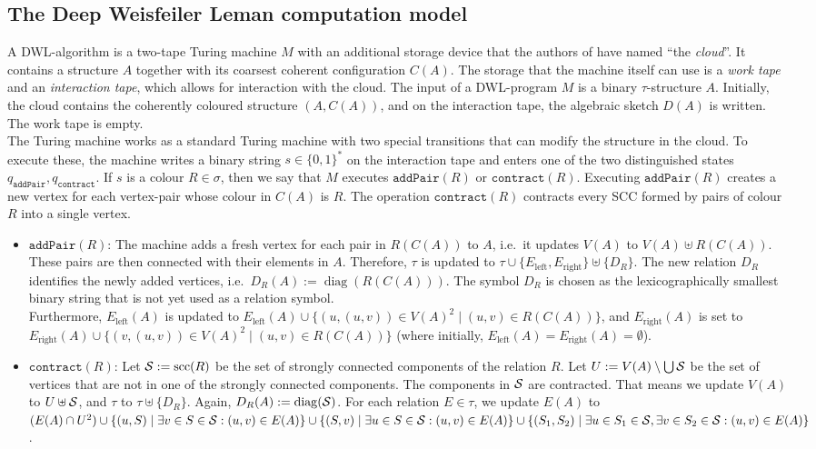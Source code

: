 \documentclass[a4paper,UKenglish,cleveref, autoref, thm-restate]{lipics-v2021}
\newcommand{\Ss}{{\cal S}}
\newcommand{\pairOp }{\texttt{addPair}}
\newcommand{\sccOp }{\texttt{contract}}
\newcommand{\scc}{{\operatorname{scc}}}
\newcommand{\diag}{{\operatorname{diag}}}
\begin{document}
	\subsection{The Deep Weisfeiler Leman computation model} 
	\label{sec:PC_DWLdefinition}
	A DWL-algorithm is a two-tape Turing machine $M$ with an additional storage device that the authors of \cite{dwl} have named ``the \emph{cloud}''. It contains a structure $A$ together with its coarsest coherent configuration $C(A)$.
	The storage that the machine itself can use is a \emph{work tape} and an \emph{interaction tape}, which allows for interaction with the cloud. The input of a DWL-program $M$ is a binary $\tau$-structure $A$. Initially, the cloud contains the coherently coloured structure $(A, C(A))$, and on the interaction tape, the algebraic sketch $D(A)$ is written. The work tape is empty.\\
	The Turing machine works as a standard Turing machine with two special transitions that can modify the structure in the cloud. To execute these, the machine writes a binary string $s \in \{0,1\}^*$ on the interaction tape and enters one of the two distinguished states $q_{\pairOp}, q_{\sccOp}$. If $s$ is a colour $R \in \sigma$, then we say that $M$ executes $\pairOp(R)$ or $\sccOp(R)$. Executing $\pairOp(R)$ creates a new vertex for each vertex-pair whose colour in $C(A)$ is $R$. The operation $\sccOp(R)$ contracts every SCC formed by pairs of colour $R$ into a single vertex.
	\begin{itemize}
		\item $\pairOp(R)$: The machine adds a fresh vertex for each pair in $R(C(A))$ to $A$, i.e.\ it updates $V(A)$ to $V(A) \uplus R(C(A))$. These pairs are then connected with their elements in $A$. Therefore, $\tau$ is updated to $\tau \cup \{E_{\text{left}},E_{\text{right}}\} \uplus \{D_R\}$. The new relation $D_R$ identifies the newly added vertices, i.e.\ $D_R(A) := \diag(R(C(A)))$. The symbol $D_R$ is chosen as the lexicographically smallest binary string that is not yet used as a relation symbol.\\
		Furthermore, $E_{\text{left}}(A)$ is updated to $E_{\text{left}}(A) \cup \{(u,(u,v)) \in V(A)^2 \mid (u,v) \in R(C(A))  \}$, and $E_{\text{right}}(A)$ is set to $E_{\text{right}}(A) \cup \{(v,(u,v)) \in V(A)^2 \mid (u,v) \in R(C(A))  \}$ (where initially, $E_{\text{left}}(A) = E_{\text{right}}(A) = \emptyset$).
		\item $\sccOp(R)$: Let $\Ss := \scc(R)$ be the set of strongly connected components of the relation $R$. Let $U := V(A) \setminus \bigcup \Ss$ be the set of vertices that are not in one of the strongly connected components. The components in $\Ss$ are contracted. That means we update $V(A)$ to $U \uplus \Ss$, and $\tau$ to $\tau \uplus \{D_R\}$. Again, $D_R(A) := \diag(\Ss)$. For each relation $E \in \tau$, we update $E(A)$ to $(E(A) \cap U^2) \cup \{(u,S) \mid \exists v \in S \in \Ss: (u,v) \in E(A)  \} \cup \{ (S,v) \mid  \exists u \in S \in \Ss: (u,v) \in E(A) \} \cup \{ (S_1,S_2) \mid \exists u \in S_1 \in \Ss, \exists v \in S_2 \in \Ss: (u,v) \in E(A)  \}$. 
	\end{itemize}
\end{document}
